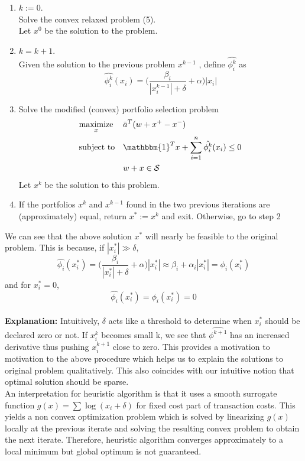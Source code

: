 \documentclass[a4paper]{article}
\begin{document}
\begin{enumerate}
\item
$k:=0.$\\
Solve the convex relaxed problem (5).\\
Let $x^0$ be the solution to the problem.\\
\item
$k=k+1$.\\
Given the solution to the previous problem $x^{k-1}$ , define $\hat{\phi_i^k}$ as
$$
\hat{\phi_i^k}(x_i)= \Big(\frac{\beta_i}{|x_i^{k-1}|+\delta}+ \alpha\Big) |x_i|
$$
\item
Solve the modified (convex) portfolio selection problem
\begin{equation}
\begin{aligned}
& \underset{x}{\text{maximize}}
& & \bar{a}^T (w+x^+ - x^-) \\
& \text{subject to}
& & \mathbbm{1}^Tx + \displaystyle \sum_{i=1}^n \hat{\phi_i^k}(x_i) \leq 0  \\
& & & w+x \in \mathcal{S}\\
\end{aligned}
\end{equation}
Let $x^k$ be the solution to this problem.
\item
If the portfolios $x^k$ and $x^{k-1}$ found in the two previous iterations are (approximately)
equal, return $ x^* := x^k $ and exit.
Otherwise, go to step 2
\end{enumerate}

We can see that the above solution $x^*$ will nearly be feasible to the original problem. This is because, if $|x_i^*| \gg \delta
$,
$$
\hat{\phi_i}(x_i^*)= \Big(\frac{\beta_i}{|x_i^{*}|+\delta}+ \alpha\Big) |x_i^*| \approx \beta_i + \alpha_i |x_i^*| = \phi_i(x_i^*)
$$
and for $x_i^*=0$,
$$
\hat{\phi_i}(x_i^*)=\phi_i(x_i^*)=0
$$
\\

\textbf{Explanation:} Intuitively, $\delta$ acts like a threshold to determine when $x_i^*$ should be declared zero or not. If $x_i^k$ becomes small k, we see that $\hat{\phi^{k+1}}$ has an increased derivative thus pushing $x_i^{k+1}$ close to zero. This provides a motivation to motivation to the above procedure which helps us to explain the solutions to original problem qualitatively. This also coincides with our intuitive notion that optimal solution should be sparse.\\
An interpretation for heuristic algorithm is that it uses a smooth surrogate function 
$g(x) = \sum \log(x_i + \delta)$ for fixed cost part of transaction costs. This yields a non convex optimization problem which is solved by linearizing $g(x)$ locally at the previous iterate and solving the resulting convex problem to obtain the next iterate. Therefore, heuristic algorithm converges approximately to a local minimum but global optimum is not guaranteed.
\\
\end{document}
